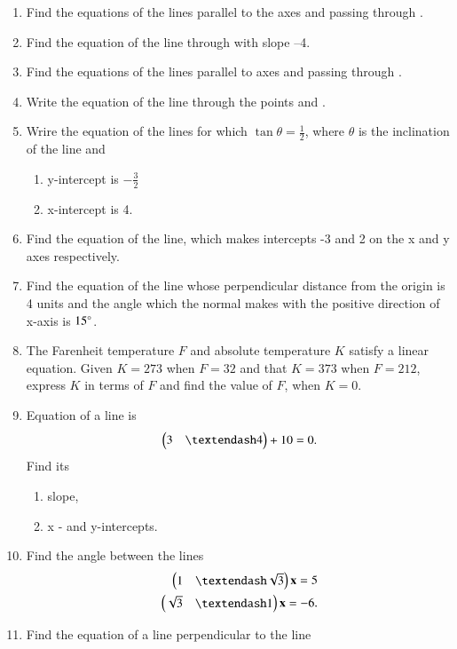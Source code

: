 \begin{enumerate}[label=\arabic*.,ref=\thesubsection.\theenumi]
\item Find the equations of the lines parallel to the axes and passing through .
\item Find the equation of the line through  with slope –4.
\item Find the equations of the lines parallel to axes and passing through .
\item Write the equation of the line through the points  and .
\item Wrire the equation of the lines for which $\tan \theta = \frac{1}{2}$, where $\theta$ is the inclination of the line and 
\begin{enumerate}
\item y-intercept is $-\frac{3}{2}$
\item x-intercept is 4.
\end{enumerate}
\item Find the equation of the line, which makes intercepts -3 and 2 on the x and y axes respectively.
\item Find the equation of the line whose perpendicular distance from the origin is 4 units and the angle which the normal makes with the positive direction of x-axis is $15\degree$.
\item The Farenheit temperature $F$ and absolute temperature $K$ satisfy a linear equation.  Given $K=273$ when $F=32$ and that $K=373$  when $F=212$, express $K$ in terms of $F$ and find the value of $F$, when $K=0$.
\item Equation of a line is 
\begin{align}
\myvec{3 & – 4} + 10 = 0. 
\end{align}
Find its 
\begin{enumerate}
\item  slope, 
\item  x - and y-intercepts.
\end{enumerate}
\item Find the angle between the lines 
\begin{align}
\myvec{1 & – \sqrt{3}}\vec{x}  = 5
\\
\myvec{\sqrt{3} & –1}\vec{x}  = -6
. 
\end{align}
\item Find the equation of a line perpendicular to the line 
\begin{align}

\end{align}
\end{enumerate}
